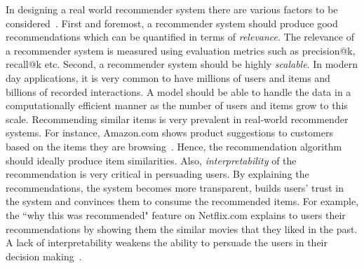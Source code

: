In designing a real world recommender system there are various factors to be
considered~\citep{adomavicius2005toward, ricci2011introduction}. First and foremost, a recommender system should  produce good recommendations which can be quantified in terms of \textsl{relevance}. The relevance of a recommender system is measured using evaluation metrics such as \textsf{precision@k}, \textsf{recall@k} etc. Second, a recommender system should be highly \textsl{scalable}. In modern day applications, it is very common to have millions of users and items and billions of recorded interactions. A model should be able to handle the data in a computationally efficient manner as the number of users and items grow to this scale.
Recommending similar items is very prevalent in  real-world recommender systems. For instance, Amazon.com shows product suggestions to customers based on the items they are browsing~\citep{linden2003amazon}. Hence, the recommendation algorithm should ideally produce item similarities.
  Also, \textsl{interpretability} of the recommendation is very critical in persuading users. By explaining the recommendations, the system becomes more transparent, builds users' trust in the system and convinces them to consume the recommended items. For example, the ``why this was recommended" feature on Netflix.com explains to users their recommendations by showing them the similar movies that they liked in the past. A lack of interpretability weakens the ability to persuade the users in their decision making~\citep{explainabiltyVIG2009}.

